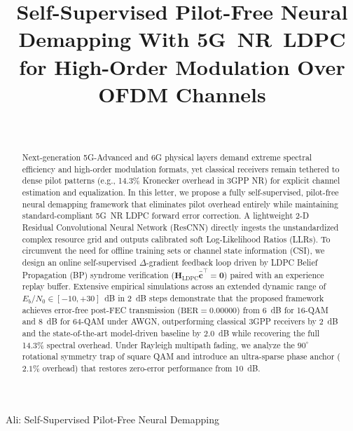 ﻿\documentclass[journal,twoside]{IEEEtran}
\begin{document}
\title{Self-Supervised Pilot-Free Neural Demapping With 5G~NR~LDPC\\
for High-Order Modulation Over OFDM Channels}

\author{%
  \\
}

%
{Ali: Self-Supervised Pilot-Free Neural Demapping}

\maketitle

\begin{abstract}
Next-generation 5G-Advanced and 6G physical layers demand extreme spectral
efficiency and high-order modulation formats, yet classical receivers remain
tethered to dense pilot patterns (e.g., 14.3\% Kronecker overhead in 3GPP NR)
for explicit channel estimation and equalization.
In this letter, we propose a fully self-supervised, pilot-free neural demapping
framework that eliminates pilot overhead entirely while maintaining standard-compliant
5G~NR LDPC forward error correction.
A lightweight 2-D Residual Convolutional Neural Network (ResCNN) directly ingests
the unstandardized complex resource grid and outputs calibrated soft Log-Likelihood
Ratios (LLRs). 
To circumvent the need for offline training sets or channel state information (CSI),
we design an online self-supervised $\Delta$-gradient feedback loop driven by
LDPC Belief Propagation (BP) syndrome verification ($\mathbf{H}_{\mathrm{LDPC}}\hat{\mathbf{c}}^\top = \mathbf{0}$)
paired with an experience replay buffer.
Extensive empirical simulations across an extended dynamic range of
$E_b/N_0 \in [-10, +30]$~dB in 2~dB steps demonstrate that the proposed framework
achieves error-free post-FEC transmission ($\text{BER} = 0.00000$) from $6$~dB
for 16-QAM and $8$~dB for 64-QAM under AWGN, outperforming classical 3GPP receivers
by $2$~dB and the state-of-the-art model-driven baseline by $2.0$~dB while recovering
the full 14.3\% spectral overhead.
Under Rayleigh multipath fading, we analyze the $90^\circ$ rotational symmetry
trap of square QAM and introduce an ultra-sparse phase anchor ($2.1\%$ overhead)
that restores zero-error performance from $10$~dB.
\end{abstract}
\end{document}
